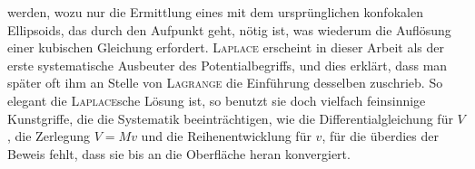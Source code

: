 werden, wozu nur die Ermittlung eines mit dem ursprünglichen konfokalen
Ellipsoids, das durch den Aufpunkt geht, nötig ist, was wiederum die
Auflösung einer kubischen Gleichung erfordert. \textsc{Laplace} erscheint in dieser
Arbeit als der erste systematische Ausbeuter des Potentialbegriffs, und dies
erklärt, dass man später oft ihm an Stelle von \textsc{Lagrange} die Einführung desselben
zuschrieb. So elegant die \textsc{Laplace}sche Lösung ist, so benutzt sie doch
vielfach feinsinnige Kunstgriffe, die die Systematik beeinträchtigen, wie die
\clearpage{}
\HistoricalFoot{}{5\textsuperscript{*}}
\noindent Differentialgleichung für \(V\), die Zerlegung \(V=Mv\) und die Reihenentwicklung
für \(v\), für die überdies der Beweis fehlt, dass sie bis an die Oberfläche
heran konvergiert.


